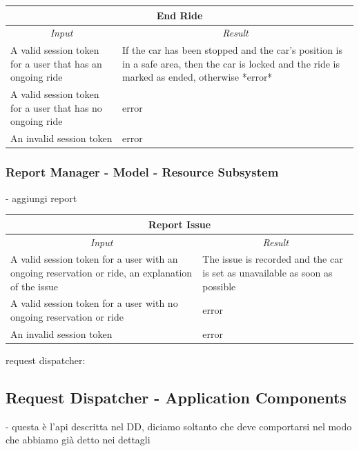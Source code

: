 \documentclass[english]{article}
\begin{document}
\begin{center}

	\begin{tabular}{ | p{6cm} | p{6cm} | }
		\hline 
		\multicolumn{2}{|c|}{\textbf{End Ride}} \\
		\hline
		\multicolumn{1}{|c|}{\textit{Input}} & \multicolumn{1}{c|}{\textit{Result}} \\
		\hline
		A valid session token for a user that has an ongoing ride  & If the car has been stopped and the car's position is in a safe area, then the car is locked and the ride is marked as ended, otherwise *error* \\
		\hline
		A valid session token for a user that has no ongoing ride &  error \\
		\hline
		An invalid session token & error \\
		\hline
	\end{tabular}
\end{center}

\subsubsection{Report Manager - Model - Resource Subsystem}
- aggiungi report

\begin{center}

	\begin{tabular}{ | p{6cm} | p{6cm} | }
		\hline 
		\multicolumn{2}{|c|}{\textbf{Report Issue}} \\
		\hline
		\multicolumn{1}{|c|}{\textit{Input}} & \multicolumn{1}{c|}{\textit{Result}} \\
		\hline
		A valid session token for a user with an ongoing reservation or ride, an explanation of the issue & The issue is recorded and the car is set as unavailable as soon as possible \\
		\hline
		A valid session token for a user with no ongoing reservation or ride & error \\
		\hline
		An invalid session token & error \\
		\hline
	\end{tabular}
\end{center}

request dispatcher:
\subsection{Request Dispatcher - Application Components}
- questa è l'api descritta nel DD, diciamo soltanto che deve comportarsi nel modo che abbiamo già detto nei dettagli
\end{document}
